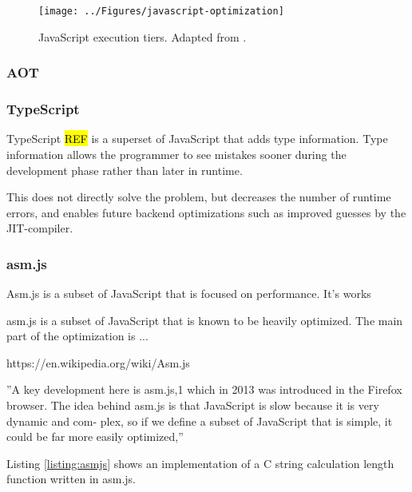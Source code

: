 \begin{figure}[!h]
\centering
\texttt{[image: ../Figures/javascript-optimization]}
\caption{JavaScript execution tiers. Adapted from \textcite{ParkKimMoon2017}.}
\label{javascript-optimization}
\end{figure}

\subsubsection*{AOT}

\subsubsection*{TypeScript}

TypeScript \hl{REF} is a superset of JavaScript that adds type information. Type information allows the programmer to see mistakes sooner during the development phase rather than later in runtime.



This does not directly solve the problem, but decreases the number of runtime errors, and enables future backend optimizations such as improved guesses by the JIT-compiler.

\subsubsection{asm.js}

Asm.js is a subset of JavaScript that is focused on performance. It's works 

asm.js is a subset of JavaScript that is known to be heavily optimized. The main part of the optimization is ...

https://en.wikipedia.org/wiki/Asm.js

''A key development here is asm.js,1 which in 2013 was introduced in the Firefox browser. The idea behind asm.js is that JavaScript is slow because it is very dynamic and com- plex, so if we define a subset of JavaScript that is simple, it could be far more easily optimized,'' \parencite{Zakai2018}



Listing \ref{listing:asmjs} shows an implementation of a C string calculation length function written in asm.js.


